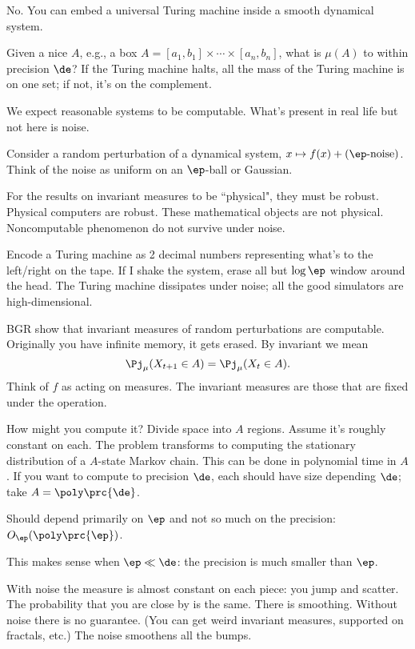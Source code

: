 No. You can embed a universal Turing machine inside a smooth dynamical system.

Given a nice $A$, e.g., a box $A=[a_1,b_1]\times \cdots \times [a_n,b_n]$, what is $\mu(A)$ to within precision $\de$? If the Turing machine halts, all the mass of the Turing machine is on one set; if not, it's on the complement.

We expect reasonable systems to be computable. What's present in real life but not here is noise.

Consider a random perturbation of a dynamical system, $x\mapsto f(x)+(\ep\text{-noise})$. Think of the noise as uniform on an $\ep$-ball or Gaussian. 

For the results on invariant measures to be ``physical", they must be robust. Physical computers are robust. These mathematical objects are not physical. Noncomputable phenomenon do not survive under noise. 

Encode a Turing machine as 2 decimal numbers representing what's to the left/right on the tape. If I shake the system, erase all but $\log\ep$ window around the head. The Turing machine dissipates under noise; all the good simulators are high-dimensional.

BGR show that invariant measures of random perturbations are computable. Originally you have infinite memory, it gets erased.
By invariant we mean 
\[
\Pj_\mu(X_{t+1}\in A) = \Pj_\mu(X_t\in A).
\]
Think of $f$ as acting on measures. The invariant measures are those that are fixed under the operation.


How might you compute it? Divide space into $A$ regions. Assume it's roughly constant on each. The problem transforms to computing the stationary  distribution of a $A$-state Markov chain. This can be done in polynomial time in $A$. If you want to compute to precision $\de$, each should have size depending $\de$; take $A=\poly\prc{\de}$.

Should depend primarily on $\ep$ and not so much on the precision: $O_\ep(\poly\prc{\ep})$.

This makes sense when $\ep\ll \de$: the precision is much smaller than $\ep$.

With noise the measure is almost constant on each piece: you jump and scatter. The probability that you are close by is the same. There is smoothing. Without noise there is no guarantee. (You can get weird invariant measures, supported on fractals, etc.) The noise smoothens all the bumps.

